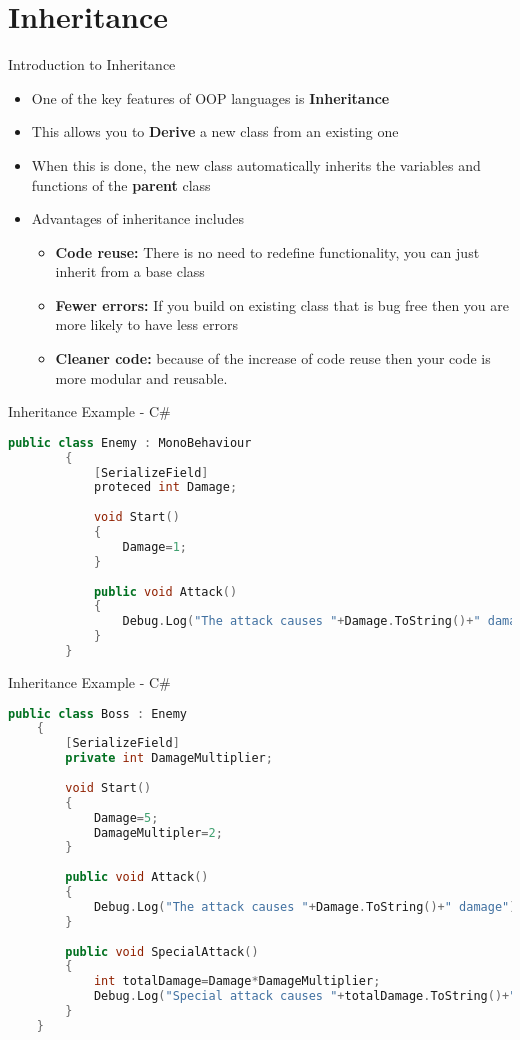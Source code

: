 \part{Inheritance}
\frame{\partpage}

\begin{frame}{Introduction to Inheritance}
	\begin{itemize}
		\pause \item One of the key features of OOP languages is \textbf{Inheritance}
		\pause \item This allows you to \textbf{Derive} a new class from an existing one
		\pause \item When this is done, the new class automatically inherits the variables and functions of the \textbf{parent} class
		\pause \item Advantages of inheritance includes
		\begin{itemize}
			\pause \item \textbf{Code reuse:} There is no need to redefine functionality, you can just inherit from a base class
			\pause \item \textbf{Fewer errors:} If you build on existing class that is bug free then you are more likely to have less errors
			\pause \item \textbf{Cleaner code:} because of the increase of code reuse then your code is more modular and reusable. 
		\end{itemize}
	\end{itemize}
\end{frame}

\begin{frame}[fragile]{Inheritance Example - C\#}
		\begin{lstlisting}[language=C++,basicstyle=\tiny,]
		public class Enemy : MonoBehaviour
		{
			[SerializeField]
			proteced int Damage;
			
			void Start()
			{
				Damage=1;
			}
			
			public void Attack()
			{
				Debug.Log("The attack causes "+Damage.ToString()+" damage");
			}
		}
		\end{lstlisting}
\end{frame}

\begin{frame}[fragile]{Inheritance Example - C\#}
	\begin{lstlisting}[language=C++,basicstyle=\tiny,]
	public class Boss : Enemy
	{
		[SerializeField]
		private int DamageMultiplier; 
		
		void Start()
		{
			Damage=5;
			DamageMultipler=2;
		}
		
		public void Attack()
		{
			Debug.Log("The attack causes "+Damage.ToString()+" damage");
		}
		
		public void SpecialAttack()
		{
			int totalDamage=Damage*DamageMultiplier;
			Debug.Log("Special attack causes "+totalDamage.ToString()+" damage");
		}
	}
	\end{lstlisting}
\end{frame}

